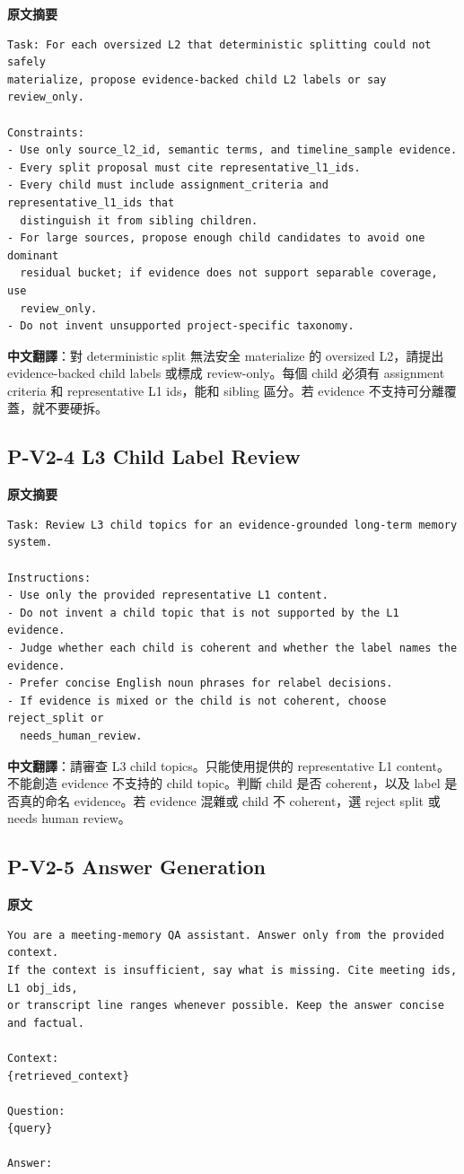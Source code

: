 \documentclass[11pt]{article}
\begin{document}
\textbf{原文摘要}
\begin{Verbatim}
Task: For each oversized L2 that deterministic splitting could not safely
materialize, propose evidence-backed child L2 labels or say review_only.

Constraints:
- Use only source_l2_id, semantic terms, and timeline_sample evidence.
- Every split proposal must cite representative_l1_ids.
- Every child must include assignment_criteria and representative_l1_ids that
  distinguish it from sibling children.
- For large sources, propose enough child candidates to avoid one dominant
  residual bucket; if evidence does not support separable coverage, use
  review_only.
- Do not invent unsupported project-specific taxonomy.
\end{Verbatim}

\textbf{中文翻譯}：對 deterministic split 無法安全 materialize 的 oversized L2，請提出 evidence-backed child labels 或標成 review-only。每個 child 必須有 assignment criteria 和 representative L1 ids，能和 sibling 區分。若 evidence 不支持可分離覆蓋，就不要硬拆。

\subsection{P-V2-4 L3 Child Label Review}

\textbf{原文摘要}
\begin{Verbatim}
Task: Review L3 child topics for an evidence-grounded long-term memory system.

Instructions:
- Use only the provided representative L1 content.
- Do not invent a child topic that is not supported by the L1 evidence.
- Judge whether each child is coherent and whether the label names the evidence.
- Prefer concise English noun phrases for relabel decisions.
- If evidence is mixed or the child is not coherent, choose reject_split or
  needs_human_review.
\end{Verbatim}

\textbf{中文翻譯}：請審查 L3 child topics。只能使用提供的 representative L1 content。不能創造 evidence 不支持的 child topic。判斷 child 是否 coherent，以及 label 是否真的命名 evidence。若 evidence 混雜或 child 不 coherent，選 reject split 或 needs human review。

\subsection{P-V2-5 Answer Generation}

\textbf{原文}
\begin{Verbatim}
You are a meeting-memory QA assistant. Answer only from the provided context.
If the context is insufficient, say what is missing. Cite meeting ids, L1 obj_ids,
or transcript line ranges whenever possible. Keep the answer concise and factual.

Context:
{retrieved_context}

Question:
{query}

Answer:
\end{Verbatim}
\end{document}
